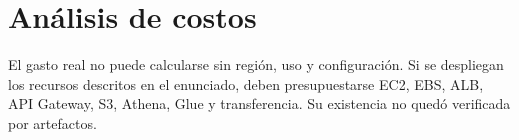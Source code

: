 \chapter{Análisis de costos}El gasto real no puede calcularse sin región, uso y configuración. Si se despliegan los recursos descritos en el enunciado, deben presupuestarse EC2, EBS, ALB, API Gateway, S3, Athena, Glue y transferencia. Su existencia no quedó verificada por artefactos.
